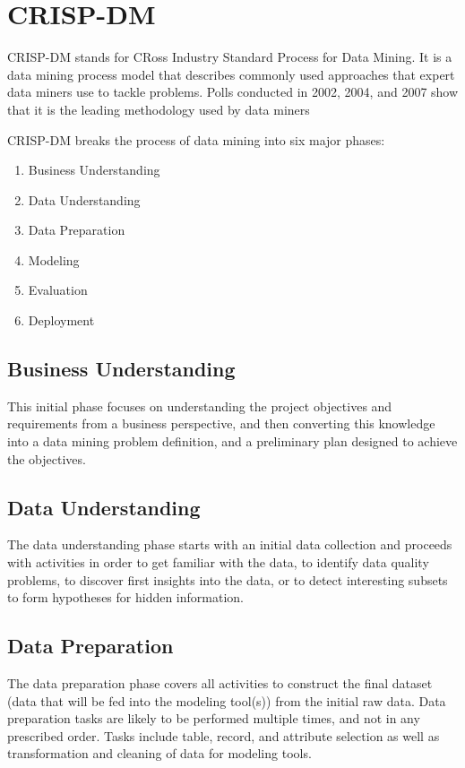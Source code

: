 \section{CRISP-DM}

CRISP-DM stands for CRoss Industry Standard Process for Data Mining. It is a data mining process model that describes commonly used approaches that expert data miners use to tackle problems. Polls conducted in 2002, 2004, and 2007 show that it is the leading methodology used by data miners

CRISP-DM breaks the process of data mining into six major phases:

\begin{enumerate}
\item Business Understanding
\item Data Understanding
\item Data Preparation
\item Modeling
\item Evaluation
\item Deployment
\end{enumerate}

\subsection{Business Understanding}

This initial phase focuses on understanding the project objectives and requirements from a business perspective, and then converting this knowledge into a data mining problem definition, and a preliminary plan designed to achieve the objectives.


\subsection{Data Understanding}

The data understanding phase starts with an initial data collection and proceeds with activities in order to get familiar with the data, to identify data quality problems, to discover first insights into the data, or to detect interesting subsets to form hypotheses for hidden information.


\subsection{Data Preparation}

The data preparation phase covers all activities to construct the final dataset (data that will be fed into the modeling tool(s)) from the initial raw data. Data preparation tasks are likely to be performed multiple times, and not in any prescribed order. Tasks include table, record, and attribute selection as well as transformation and cleaning of data for modeling tools.



